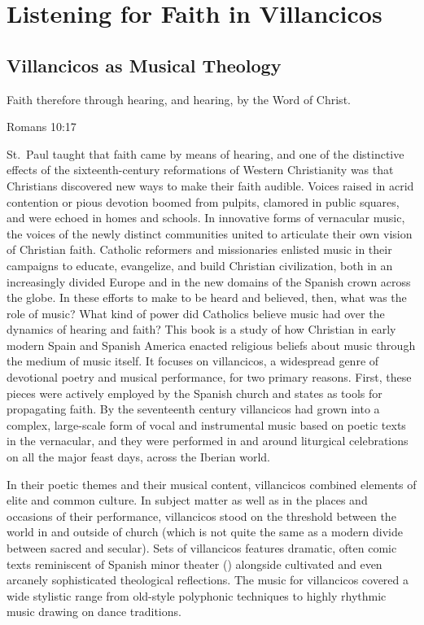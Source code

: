%

\part{Listening for Faith in Villancicos}

\chapter{Villancicos as Musical Theology}

\label{ch:musical-theology}

\epigraph
{Faith therefore  through hearing, and hearing, by the Word of Christ.}
{Romans 10:17}

St.~Paul taught that faith came by means of hearing, and one of the distinctive effects of the sixteenth-century reformations of Western Christianity was that Christians discovered new ways to make their faith audible.
Voices raised in acrid contention or pious devotion boomed from pulpits, clamored in public squares, and were echoed in homes and schools.
In innovative forms of vernacular music, the voices of the newly distinct communities united to articulate their own vision of Christian faith.
Catholic reformers and missionaries enlisted music in their campaigns to educate, evangelize, and build Christian civilization, both in an increasingly divided Europe and in the new domains of the Spanish crown across the globe.
In these efforts to make  to be heard and believed, then, what was the role of music?
What kind of power did Catholics believe music had over the dynamics of hearing and faith?  
This book is a study of how Christian in early modern Spain and Spanish America enacted religious beliefs about music through the medium of music itself.
It focuses on villancicos, a widespread genre of devotional poetry and musical performance, for two primary reasons.
First, these pieces were actively employed by the Spanish church and states as tools for propagating faith.
By the seventeenth century villancicos had grown into a complex, large-scale form of vocal and instrumental music based on poetic texts in the vernacular, and they were performed in and around liturgical celebrations on all the major feast days, across the Iberian world.

In their poetic themes and their musical content, villancicos combined elements of elite and common culture.
In subject matter as well as in the places and occasions of their performance, villancicos stood on the threshold between the world in and outside of church (which is not quite the same as a modern divide between sacred and secular).
Sets of villancicos features dramatic, often comic texts reminiscent of Spanish minor theater () alongside cultivated and even arcanely sophisticated theological reflections.
The music for villancicos covered a wide stylistic range from old-style polyphonic techniques to highly rhythmic music drawing on dance traditions.

